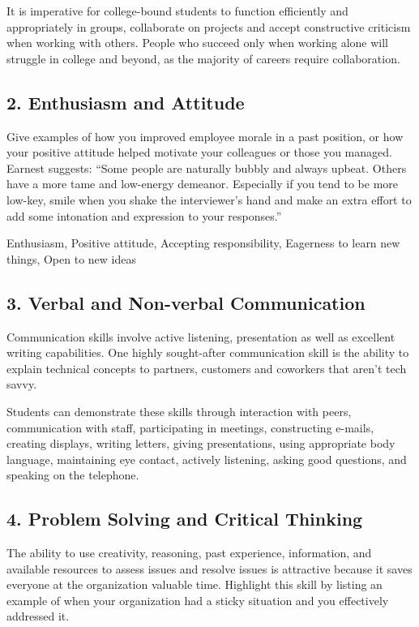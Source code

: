 \documentclass[letterpaper,10pt]{memoir}
\begin{document}
	It is imperative for college-bound students to function efficiently and appropriately in groups, collaborate on projects and accept constructive criticism when working with others. People who succeed only when working alone will struggle in college and beyond, as the majority of careers require collaboration.


	\subsection*{2. Enthusiasm and Attitude}
	Give examples of how you improved employee morale in a past position, or how your positive attitude helped motivate your colleagues or those you managed. Earnest suggests: ``Some people are naturally bubbly and always upbeat. Others have a more tame and low-energy demeanor. Especially if you tend to be more low-key, smile when you shake the interviewer's hand and make an extra effort to add some intonation and expression to your responses.''

	Enthusiasm, Positive attitude, Accepting responsibility, Eagerness to learn new things, Open to new ideas

	
	\subsection*{3. Verbal and Non-verbal Communication}
	Communication skills involve active listening, presentation as well as excellent writing capabilities. One highly sought-after communication skill is the ability to explain technical concepts to partners, customers and coworkers that aren't tech savvy.

	Students can demonstrate these skills through interaction with peers, communication with staff, participating in meetings, constructing e-mails, creating displays, writing letters, giving presentations, using appropriate body language, maintaining eye contact, actively listening, asking good questions, and speaking on the telephone.


	\subsection*{4. Problem Solving and Critical Thinking}
	The ability to use creativity, reasoning, past experience, information, and available resources to assess issues and resolve issues is attractive because it saves everyone at the organization valuable time. Highlight this skill by listing an example of when your organization had a sticky situation and you effectively addressed it.
\end{document}
